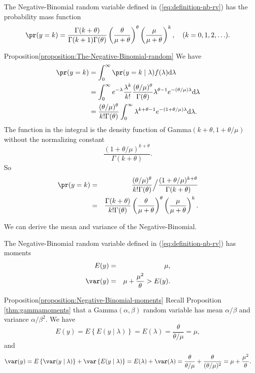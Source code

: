 \begin{proposition}
\label{proposition:The-Negative-Binomial-random}The Negative-Binomial random
variable defined in (\ref{eq:definition-nb-rv}) has the probability
mass function
\[
\pr(y=k)=\frac{\Gamma(k+\theta)}{\Gamma(k+1)\Gamma(\theta)}\left(\frac{\theta}{\mu+\theta}\right)^{\theta}\left(\frac{\mu}{\mu+\theta}\right)^{k},\quad(k=0,1,2,\ldots).
\]
\end{proposition}



\begin{myproof}{Proposition}{\ref{proposition:The-Negative-Binomial-random}}
We have
\begin{align*}
\pr(y  =k)&=\int_{0}^{\infty}\pr(y=k\mid\lambda)f(\lambda)\text{d}\lambda\\
 & =\int_{0}^{\infty}e^{-\lambda}\frac{\lambda^{k}}{k!}\frac{(\theta/\mu)^{\theta}}{\Gamma(\theta)}\lambda^{\theta-1}e^{-(\theta/\mu)\lambda}\text{d}\lambda\\
 & =\frac{(\theta/\mu)^{\theta}}{k!\Gamma(\theta)}\int_{0}^{\infty}\lambda^{k+\theta-1}e^{-(1+\theta/\mu)\lambda}\text{d}\lambda.
\end{align*}
The function in the integral is the density function of Gamma$(k+\theta,1+\theta/\mu)$
without the normalizing constant 
\[
\frac{(1+\theta/\mu)^{k+\theta}}{\Gamma(k+\theta)}.
\]
So 
\begin{eqnarray*}
 \pr(y  =k) 
 &=&\frac{(\theta/\mu)^{\theta}}{k!\Gamma(\theta)}\Big/\frac{(1+\theta/\mu)^{k+\theta}}{\Gamma(k+\theta)} \\
 &=&\frac{\Gamma(k+\theta)}{k!\Gamma(\theta)}\left(\frac{\theta}{\mu+\theta}\right)^{\theta}\left(\frac{\mu}{\mu+\theta}\right)^{k}.
\end{eqnarray*}
\end{myproof}



We can derive the mean and variance of the Negative-Binomial. 


\begin{proposition}
\label{proposition:Negative-Binomial-moments}The Negative-Binomial random
variable defined in (\ref{eq:definition-nb-rv}) has moments
\begin{eqnarray*}
E(y)    &=& \mu,\\
\var(y) &=& \mu+\frac{\mu^{2}}{\theta}>E(y).
\end{eqnarray*}
\end{proposition}

\begin{myproof}{Proposition}{\ref{proposition:Negative-Binomial-moments}}
Recall Proposition \ref{thm:gammamoments} that a Gamma$(\alpha,\beta)$ random variable has mean $\alpha / \beta$ and variance $\alpha / \beta^2$. 
 We have 
 $$
 E(y)=E\left\{ E(y\mid\lambda)\right\} =E(\lambda)=\frac{\theta}{\theta/\mu}=\mu,
 $$
 and
 $$\var(y)	=E\left\{ \var(y\mid\lambda)\right\} +\var\left\{ E(y\mid\lambda)\right\} 
	=E(\lambda)+\var(\lambda)
	=\frac{\theta}{\theta/\mu}+\frac{\theta}{(\theta/\mu)^{2}}
	=\mu+\frac{\mu^{2}}{\theta}.
	$$
\end{myproof}


